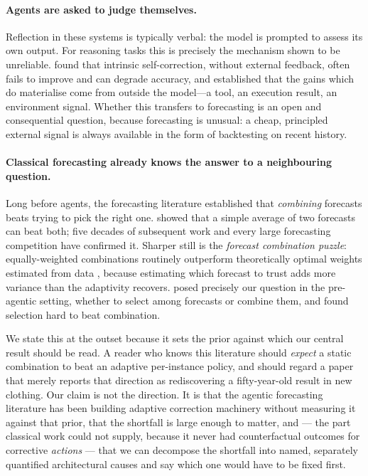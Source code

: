\paragraph{Agents are asked to judge themselves.}
Reflection in these systems is typically verbal: the model is prompted to assess its own
output. For reasoning tasks this is precisely the mechanism shown to be unreliable.
\citet{huang2024selfcorrect} found that intrinsic self-correction, without external
feedback, often fails to improve and can degrade accuracy, and
\citet{kamoi2024selfcorrect} established that the gains which do materialise come from
outside the model---a tool, an execution result, an environment signal. Whether this
transfers to forecasting is an open and consequential question, because forecasting is
unusual: a cheap, principled external signal is always available in the form of
backtesting on recent history.

\paragraph{Classical forecasting already knows the answer to a neighbouring question.}
Long before agents, the forecasting literature established that \emph{combining}
forecasts beats trying to pick the right one. \citet{bates1969} showed that a simple
average of two forecasts can beat both; five decades of subsequent work
\citep{clemen1989,timmermann2006,wang2023review} and every large forecasting competition
\citep{makridakis2000m3,m4competition2020} have confirmed it. Sharper still is the
\emph{forecast combination puzzle}: equally-weighted combinations routinely outperform
theoretically optimal weights estimated from data
\citep{stockwatson2004,smithwallis2009,claeskens2016}, because estimating which forecast
to trust adds more variance than the adaptivity recovers. \citet{hibon2005} posed
precisely our question in the pre-agentic setting, whether to select among forecasts
or combine them, and found selection hard to beat combination.

We state this at the outset because it sets the prior against which our central result
should be read. A reader who knows this literature should \emph{expect} a static
combination to beat an adaptive per-instance policy, and should regard a paper that
merely reports that direction as rediscovering a fifty-year-old result in new clothing.
Our claim is not the direction. It is that the agentic forecasting literature has been
building adaptive correction machinery without measuring it against that prior, that the
shortfall is large enough to matter, and --- the part classical work could not supply,
because it never had counterfactual outcomes for corrective \emph{actions} --- that we
can decompose the shortfall into named, separately quantified architectural causes and
say which one would have to be fixed first.

